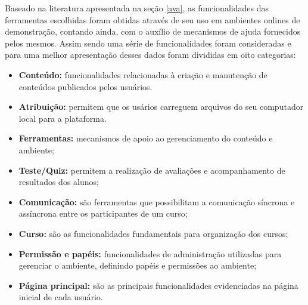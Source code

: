 Baseado na literatura apresentada na seção \ref{ava}, as funcionalidades das ferramentas escolhidas foram obtidas através de seu uso em ambientes onlines de demonstração, contando ainda, com o auxílio de mecanismos de ajuda fornecidos pelos mesmos. Assim sendo uma série de funcionalidades foram consideradas e para uma melhor apresentação desses dados foram divididas em oito categorias:
\begin{itemize}
\item \textbf{Conteúdo:} funcionalidades relacionadas à criação e manutenção de conteúdos publicados pelos usuários.
\item \textbf{Atribuição:} permitem que os usários carreguem arquivos do seu computador local para a plataforma.
\item \textbf{Ferramentas:} mecanismos de apoio ao gerenciamento do conteúdo e ambiente;
\item \textbf{Teste/Quiz:} permitem a realização de avaliações e acompanhamento de resultados dos alunos;
\item \textbf{Comunicação:} são ferramentas que possibilitam a comunicação síncrona e assíncrona entre os participantes de um curso;
\item \textbf{Curso:} são as funcionalidades fundamentais para organização dos cursos;
\item \textbf{Permissão e papéis:} funcionalidades de administração utilizadas para gerenciar o ambiente, definindo papéis e permissões ao ambiente;
\item \textbf{Página principal:} são as principais funcionalidades evidenciadas na página inicial de cada usuário.
\end{itemize}

